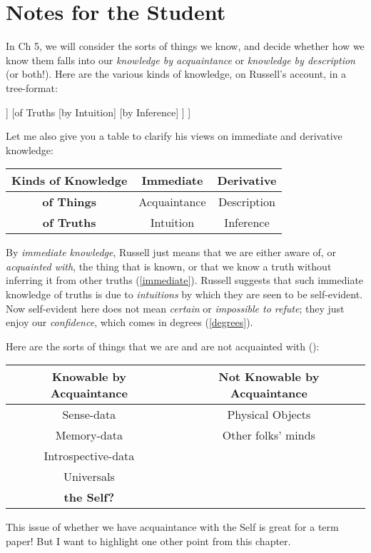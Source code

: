 \documentclass[oneside,letterpaper,12pt]{book}
\begin{document}
\section{Notes for the Student}
In Ch 5, we will consider the sorts of things we know, and decide whether how we know them falls into our \textit{knowledge by acquaintance} or \textit{knowledge by description} (or both!). 
Here are the various kinds of knowledge, on Russell's account, in a tree-format:
\begin{center}
	\begin{forest}
		[Knowledge
		[of Things
		[by Acquaintance]
		[by Description]
		]
		[of Truths
		[by Intuition]
		[by Inference]
		]
		]
	\end{forest}
\end{center}
Let me also give you a table to clarify his views on immediate and derivative knowledge:
\begin{center}
	\begin{tabular}{|c|c|c|} \hline
		\textbf{Kinds of Knowledge}& \textbf{Immediate} & \textbf{Derivative} \\ \hline
		\textbf{of Things} & Acquaintance & Description \\ \hline
		\textbf{of Truths} & Intuition & Inference \\ \hline
	\end{tabular}
\end{center}
By \textit{immediate knowledge}, Russell just means that we are either aware of, or \textit{acquainted with}, the thing that is known, or that we know a truth without inferring it from other truths (\ref{immediate}). Russell suggests that such immediate knowledge of truths is due to \textit{intuitions} by which they are seen to be self-evident. Now self-evident here does not mean \textit{certain} or \textit{impossible to refute}; they just enjoy our \textit{confidence}, which comes in degrees (\ref{degrees}).

Here are the sorts of things that we are and are not acquainted with (\pageref{acquaintance}):
\begin{center}
	\begin{tabular}{|c|c|} \hline
		\textbf{Knowable by Acquaintance}& \textbf{Not Knowable by Acquaintance} \\ \hline
		Sense-data & Physical Objects \\ \hline
		Memory-data & Other folks' minds \\ \hline
		Introspective-data &  \\ \hline
		Universals & \\ \hline
		\textbf{the Self?} & \\ \hline
	\end{tabular}
\end{center}
This issue of whether we have acquaintance with the Self is great for a term paper! But I want to highlight one other point from this chapter.
\end{document}
